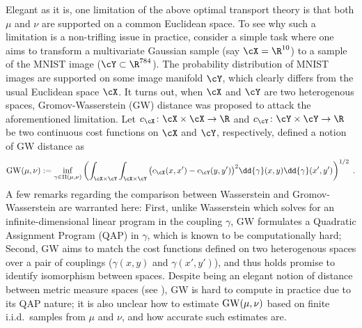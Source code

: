 \documentclass[11pt]{article}
\begin{document}
Elegant as it is, one limitation of the above optimal transport theory is that both $\mu$ and $\nu$ are supported on a common Euclidean space. To see why such a limitation is a non-trifling issue in practice, consider a simple task where one aims to transform a multivariate Gaussian sample (say $\cX = \R^{10}$) to a sample of the MNIST image ($\cY \subset \R^{784}$). The probability distribution of MNIST images are supported on some image manifold $\cY$, which clearly differs from the usual Euclidean space $\cX$. It turns out, when $\cX$ and $\cY$ are two heterogenous spaces, Gromov-Wasserstein (GW) distance was proposed to attack the aforementioned limitation. Let $c_{\cX} \colon \cX \times \cX \rightarrow \R$ and $c_{\cY} \colon \cY \times \cY \rightarrow \R$ be two continuous cost functions on $\cX$ and $\cY$, respectively, \cite{memoli_2011} defined a notion of GW distance as
\begin{align}
	\mathrm{GW}(\mu, \nu) := \inf_{\gamma \in \Pi(\mu, \nu)} \left( \int_{\cX \times \cY} \int_{\cX \times \cY} \big( c_{\cX}(x, x') -  c_{\cY}(y, y') \big)^2 \dd{\gamma} (x, y) \dd{\gamma}(x', y') \right)^{1/2} \;.
\end{align}
A few remarks regarding the comparison between Wasserstein and Gromov-Wasserstein are warranted here: First, unlike Wasserstein which solves for an infinite-dimensional linear program in the coupling $\gamma$, GW formulates a Quadratic Assignment Program (QAP) in $\gamma$, which is known to be computationally hard; Second, GW aims to match the cost functions defined on two heterogenous spaces over a pair of couplings ($\gamma(x, y)$ and $\gamma(x', y')$), and thus holds promise to identify isomorphism between spaces. Despite being an elegant notion of distance between metric measure spaces (see \cite[Definition~5.1]{memoli_2011}), GW is hard to compute in practice due to its QAP nature; it is also unclear how to estimate ${\rm GW}(\mu, \nu)$ based on finite i.i.d.\ samples from $\mu$ and $\nu$, and how accurate such estimates are.
\end{document}
